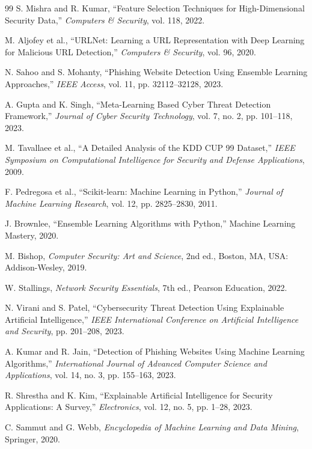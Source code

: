 \documentclass[12pt]{report}
\begin{document}
\begin{thebibliography}{99}
S. Mishra and R. Kumar,
``Feature Selection Techniques for High-Dimensional Security Data,''
\textit{Computers \& Security},
vol. 118, 2022.

M. Aljofey et al.,
``URLNet: Learning a URL Representation with Deep Learning for Malicious URL Detection,''
\textit{Computers \& Security},
vol. 96, 2020.

N. Sahoo and S. Mohanty,
``Phishing Website Detection Using Ensemble Learning Approaches,''
\textit{IEEE Access},
vol. 11, pp. 32112--32128, 2023.

A. Gupta and K. Singh,
``Meta-Learning Based Cyber Threat Detection Framework,''
\textit{Journal of Cyber Security Technology},
vol. 7, no. 2, pp. 101--118, 2023.

M. Tavallaee et al.,
``A Detailed Analysis of the KDD CUP 99 Dataset,''
\textit{IEEE Symposium on Computational Intelligence for Security and Defense Applications},
2009.

F. Pedregosa et al.,
``Scikit-learn: Machine Learning in Python,''
\textit{Journal of Machine Learning Research},
vol. 12, pp. 2825--2830, 2011.

J. Brownlee,
``Ensemble Learning Algorithms with Python,''
Machine Learning Mastery, 2020.

M. Bishop,
\textit{Computer Security: Art and Science},
2nd ed., Boston, MA, USA: Addison-Wesley, 2019.

W. Stallings,
\textit{Network Security Essentials},
7th ed., Pearson Education, 2022.

N. Virani and S. Patel,
``Cybersecurity Threat Detection Using Explainable Artificial Intelligence,''
\textit{IEEE International Conference on Artificial Intelligence and Security},
pp. 201--208, 2023.

A. Kumar and R. Jain,
``Detection of Phishing Websites Using Machine Learning Algorithms,''
\textit{International Journal of Advanced Computer Science and Applications},
vol. 14, no. 3, pp. 155--163, 2023.

R. Shrestha and K. Kim,
``Explainable Artificial Intelligence for Security Applications: A Survey,''
\textit{Electronics},
vol. 12, no. 5, pp. 1--28, 2023.

C. Sammut and G. Webb,
\textit{Encyclopedia of Machine Learning and Data Mining},
Springer, 2020.

\end{thebibliography}
\end{document}
